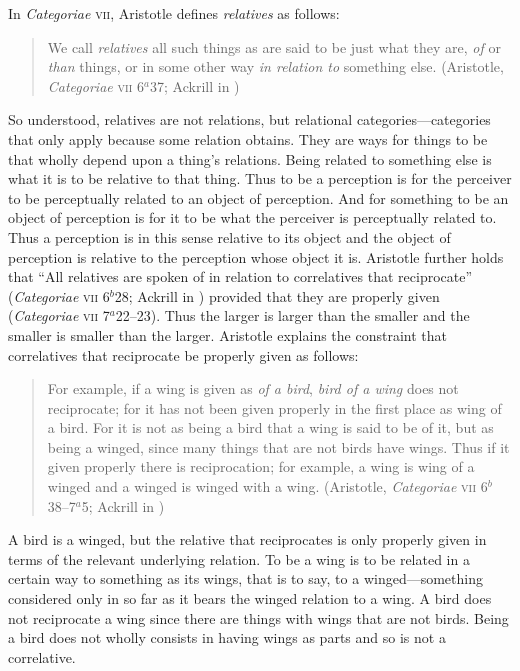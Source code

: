 In \emph{Categoriae} \textsc{vii}, Aristotle defines \emph{relatives} as follows:
\begin{quote}
    We call \emph{relatives} all such things as are said to be just what they are, \emph{of} or \emph{than} things, or in some other way \emph{in relation to} something else. (Aristotle, \emph{Categoriae} \textsc{vii} 6\( ^{a} \)37; Ackrill in \citealt[11]{Barnes:1984uq})
\end{quote}
So understood, relatives are not relations, but relational categories---categories that only apply because some relation obtains. They are ways for things to be that wholly depend upon a thing's relations. Being related to something else is what it is to be relative to that thing. Thus to be a perception is for the perceiver to be perceptually related to an object of perception. And for something to be an object of perception is for it to be what the perceiver is perceptually related to. Thus a perception is in this sense relative to its object and the object of perception is relative to the perception whose object it is. Aristotle further holds that ``All relatives are spoken of in relation to correlatives that reciprocate'' (\emph{Categoriae} \textsc{vii} 6\( ^{b} \)28; Ackrill in \citealt[11]{Barnes:1984uq}) provided that they are properly given (\emph{Categoriae} \textsc{vii} 7\( ^{a} \)22--23). Thus the larger is larger than the smaller and the smaller is smaller than the larger. Aristotle explains the constraint that correlatives that reciprocate be properly given as follows:
\begin{quote}
    For example, if a wing is given as \emph{of a bird}, \emph{bird of a wing} does not reciprocate; for it has not been given properly in the first place as wing of a bird. For it is not as being a bird that a wing is said to be of it, but as being a winged, since many things that are not birds have wings. Thus if it given properly there is reciprocation; for example, a wing is wing of a winged and a winged is winged with a wing. (Aristotle, \emph{Categoriae} \textsc{vii} 6\( ^{b} \)38--7\( ^{a} \)5; Ackrill in \citealt[12]{Barnes:1984uq})
\end{quote}
A bird is a winged, but the relative that reciprocates is only properly given in terms of the relevant underlying relation. To be a wing is to be related in a certain way to something as its wings, that is to say, to a winged---something considered only in so far as it bears the winged relation to a wing. A bird does not reciprocate a wing since there are things with wings that are not birds. Being a bird does not wholly consists in having wings as parts and so is not a correlative.

